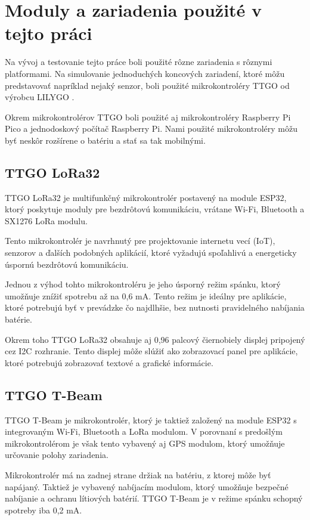\documentclass[slovak,master]{diploma}
\begin{document}
\section{Moduly a zariadenia použité v tejto práci}
Na vývoj a testovanie tejto práce boli použité rôzne zariadenia s rôznymi platformami. Na simulovanie jednoduchých koncových zariadení, 
ktoré môžu predstavovať napríklad nejaký senzor, boli použité mikrokontroléry TTGO od výrobcu LILYGO \cite{lilygo}.

Okrem mikrokontrolérov TTGO boli použité aj mikrokontroléry Raspberry Pi Pico a jednodoskový počítač Raspberry Pi.
Nami použité mikrokontroléry môžu byť neskôr rozšírene o batériu a stať sa tak mobilnými.

\subsection{TTGO LoRa32}
TTGO LoRa32 je multifunkčný mikrokontrolér postavený na module ESP32, ktorý poskytuje 
moduly pre bezdrôtovú komunikáciu, vrátane Wi-Fi, Bluetooth a SX1276 LoRa modulu. 

Tento mikrokontrolér je navrhnutý pre projektovanie internetu vecí (IoT), senzorov a ďalších podobných aplikácií, 
ktoré vyžadujú spoľahlivú a energeticky úspornú bezdrôtovú komunikáciu.

Jednou z výhod tohto mikrokontroléru je jeho úsporný režim spánku, ktorý umožňuje znížiť spotrebu až na 0,6 mA. 
Tento režim je ideálny pre aplikácie, ktoré potrebujú byť v prevádzke čo najdlhšie, bez nutnosti pravidelného nabíjania batérie.

Okrem toho TTGO LoRa32 obsahuje aj 0,96 palcový čiernobiely displej pripojený cez I2C rozhranie. 
Tento displej môže slúžiť ako zobrazovací panel pre aplikácie, ktoré potrebujú zobrazovať textové a grafické informácie.

\subsection{TTGO T-Beam}
TTGO T-Beam je mikrokontrolér, ktorý je taktiež založený na module ESP32 s integrovaným Wi-Fi, Bluetooth a LoRa modulom. 
V porovnaní s predošlým mikrokontrolérom je však tento vybavený aj GPS modulom, ktorý umožňuje určovanie polohy zariadenia.

Mikrokontrolér má na zadnej strane držiak na batériu, z ktorej môže byť napájaný. Taktiež je vybavený nabíjacím modulom, 
ktorý umožňuje bezpečné nabíjanie a ochranu lítiových batérií. TTGO T-Beam je v režime spánku schopný spotreby iba 0,2 mA. 
\end{document}
